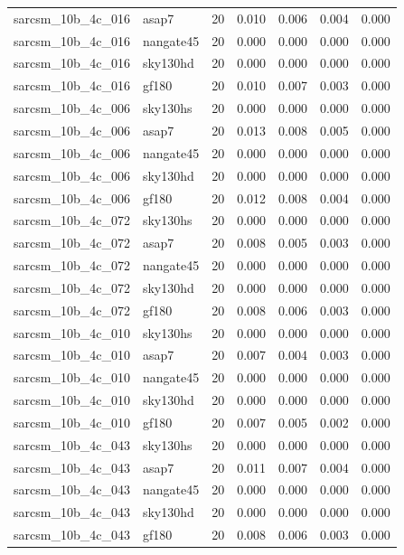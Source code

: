 \begin{tabular}{llrrrrr}
sarcsm\_10b\_4c\_016 & asap7 & 20 & 0.010 & 0.006 & 0.004 & 0.000 \\
sarcsm\_10b\_4c\_016 & nangate45 & 20 & 0.000 & 0.000 & 0.000 & 0.000 \\
sarcsm\_10b\_4c\_016 & sky130hd & 20 & 0.000 & 0.000 & 0.000 & 0.000 \\
sarcsm\_10b\_4c\_016 & gf180 & 20 & 0.010 & 0.007 & 0.003 & 0.000 \\
sarcsm\_10b\_4c\_006 & sky130hs & 20 & 0.000 & 0.000 & 0.000 & 0.000 \\
sarcsm\_10b\_4c\_006 & asap7 & 20 & 0.013 & 0.008 & 0.005 & 0.000 \\
sarcsm\_10b\_4c\_006 & nangate45 & 20 & 0.000 & 0.000 & 0.000 & 0.000 \\
sarcsm\_10b\_4c\_006 & sky130hd & 20 & 0.000 & 0.000 & 0.000 & 0.000 \\
sarcsm\_10b\_4c\_006 & gf180 & 20 & 0.012 & 0.008 & 0.004 & 0.000 \\
sarcsm\_10b\_4c\_072 & sky130hs & 20 & 0.000 & 0.000 & 0.000 & 0.000 \\
sarcsm\_10b\_4c\_072 & asap7 & 20 & 0.008 & 0.005 & 0.003 & 0.000 \\
sarcsm\_10b\_4c\_072 & nangate45 & 20 & 0.000 & 0.000 & 0.000 & 0.000 \\
sarcsm\_10b\_4c\_072 & sky130hd & 20 & 0.000 & 0.000 & 0.000 & 0.000 \\
sarcsm\_10b\_4c\_072 & gf180 & 20 & 0.008 & 0.006 & 0.003 & 0.000 \\
sarcsm\_10b\_4c\_010 & sky130hs & 20 & 0.000 & 0.000 & 0.000 & 0.000 \\
sarcsm\_10b\_4c\_010 & asap7 & 20 & 0.007 & 0.004 & 0.003 & 0.000 \\
sarcsm\_10b\_4c\_010 & nangate45 & 20 & 0.000 & 0.000 & 0.000 & 0.000 \\
sarcsm\_10b\_4c\_010 & sky130hd & 20 & 0.000 & 0.000 & 0.000 & 0.000 \\
sarcsm\_10b\_4c\_010 & gf180 & 20 & 0.007 & 0.005 & 0.002 & 0.000 \\
sarcsm\_10b\_4c\_043 & sky130hs & 20 & 0.000 & 0.000 & 0.000 & 0.000 \\
sarcsm\_10b\_4c\_043 & asap7 & 20 & 0.011 & 0.007 & 0.004 & 0.000 \\
sarcsm\_10b\_4c\_043 & nangate45 & 20 & 0.000 & 0.000 & 0.000 & 0.000 \\
sarcsm\_10b\_4c\_043 & sky130hd & 20 & 0.000 & 0.000 & 0.000 & 0.000 \\
sarcsm\_10b\_4c\_043 & gf180 & 20 & 0.008 & 0.006 & 0.003 & 0.000 \\

\end{tabular}
